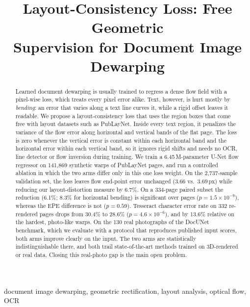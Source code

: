 \documentclass[conference]{IEEEtran}
\begin{document}
\title{Layout-Consistency Loss: Free Geometric\\Supervision for Document Image Dewarping}

\author{}

\maketitle

\begin{abstract}
Learned document dewarping is usually trained to regress a dense flow field with a pixel-wise loss, which treats every pixel error alike. Text, however, is hurt mostly by \emph{bending}: an error that varies along a text line curves it, while a rigid offset leaves it readable. We propose a layout-consistency loss that uses the region boxes that come free with layout datasets such as PubLayNet. Inside every text region, it penalizes the variance of the flow error along horizontal and vertical bands of the flat page. The loss is zero whenever the vertical error is constant within each horizontal band and the horizontal error within each vertical band, so it ignores rigid shifts and needs no OCR, line detector or flow inversion during training. We train a 6.45\,M-parameter U-Net flow regressor on 141{,}869 synthetic warps of PubLayNet pages, and run a controlled ablation in which the two arms differ only in this one loss weight. On the 2{,}737-sample validation set, the loss leaves flow end-point error unchanged (3.66 vs.\ 3.69\,px) while reducing our layout-distortion measure by 6.7\%. On a 334-page paired subset the reduction (6.1\%; 8.3\% for horizontal bending) is significant over pages ($p=1.5\times10^{-9}$), whereas the EPE difference is not ($p=0.59$). Tesseract character error rate on 332 re-rendered pages drops from 30.4\% to 28.6\% ($p=4.6\times10^{-6}$), and by 13.6\% relative on the hardest, photo-like warps. On the 130 real photographs of the DocUNet benchmark, which we evaluate with a protocol that reproduces published input scores, both arms improve clearly on the input. The two arms are statistically indistinguishable there, and both trail state-of-the-art methods trained on 3D-rendered or real data. Closing this real-photo gap is the main open problem.
\end{abstract}

\begin{IEEEkeywords}
document image dewarping, geometric rectification, layout analysis, optical flow, OCR
\end{IEEEkeywords}
\end{document}
